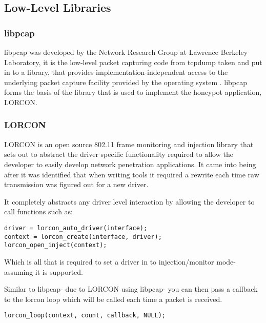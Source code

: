 \subsection{Low-Level Libraries}
\subsubsection{libpcap}
libpcap was developed by the Network Research Group at Lawrence Berkeley Laboratory, it is the low-level packet capturing code from tcpdump taken and put in to a library, that provides implementation-independent access to the underlying packet capture facility provided by the operating system \cite{research:network_programming}.  libpcap forms the basis of the library that is used to implement the honeypot application, LORCON.
\subsubsection{LORCON}
LORCON is an open source 802.11 frame monitoring and injection library that sets out to abstract the driver specific functionality required to allow the developer to easily develop network penetration applications. It came into being after it was identified that when writing tools it required a rewrite each time raw transmission was figured out for a new driver. 

It completely abstracts any driver level interaction by allowing the developer to call functions such as:

\begin{verbatim}
driver = lorcon_auto_driver(interface);
context = lorcon_create(interface, driver);
lorcon_open_inject(context);
\end{verbatim}

Which is all that is required to set a driver in to injection/monitor mode- assuming it is supported.

Similar to libpcap- due to LORCON using libpcap- you can then pass a callback to the lorcon loop which will be called each time a packet is received.

\begin{verbatim}
lorcon_loop(context, count, callback, NULL);
\end{verbatim}

